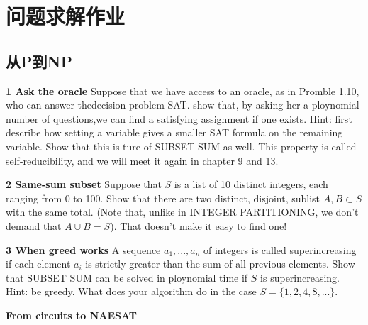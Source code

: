 \documentclass[a4paper,UTF8]{article}
\begin{document}
\section*{问题求解作业}
\subsection{从P到NP}
\textbf{1 Ask the oracle} Suppose that we have access to an oracle, as in Promble 1.10,
who can answer thedecision problem SAT. show that, by asking her a ploynomial
number of questions,we can find a satisfying assignment if one exists. Hint:
first describe how setting a variable gives a smaller SAT formula on the remaining
variable. Show that this is ture of SUBSET SUM as well. This property is called
self-reducibility, and we will meet it again in chapter 9 and 13.

 \vspace{6pt}

\textbf{2 Same-sum subset} Suppose that $S$ is a list of 10 distinct integers, each
ranging from 0 to 100. Show that there are two distinct, disjoint, sublist $A,B\subset S$
with the same total. (Note that, unlike in INTEGER PARTITIONING, we don't demand that $A\cup B = S$).
That doesn't make it easy to find one!

 \vspace{6pt}

\textbf{3 When greed works} A sequence $a_{1},...,a_{n}$ of integers is called superincreasing
if each element $a_{i}$ is strictly greater than the sum of all previous elements.
Show that SUBSET SUM can be solved in ploynomial time if $S$ is superincreasing.
Hint: be greedy. What does your algorithm do in the case $S=\{1,2,4,8,...\}$.

\vspace{6pt}

\textbf{From circuits to NAESAT} 
\end{document}
